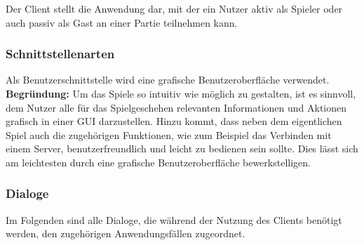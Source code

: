 Der Client stellt die Anwendung dar, mit der ein Nutzer aktiv als Spieler oder auch passiv als Gast an einer Partie teilnehmen kann.

\subsubsection{Schnittstellenarten}
Als Benutzerschnittstelle wird eine grafische Benutzeroberfläche verwendet. \\ \textbf{Begründung:} Um das Spiele so intuitiv wie möglich zu gestalten, ist es sinnvoll, dem Nutzer alle für das Spielgeschehen relevanten Informationen und Aktionen grafisch in einer GUI darzustellen. Hinzu kommt, dass neben dem eigentlichen Spiel auch die zugehörigen Funktionen, wie zum Beispiel das Verbinden mit einem Server, benutzerfreundlich und leicht zu bedienen sein sollte. Dies lässt sich am leichtesten durch eine grafische Benutzeroberfläche bewerkstelligen.

\newpage

\subsubsection{Dialoge}
Im Folgenden sind alle Dialoge, die während der Nutzung des Clients benötigt werden, den zugehörigen Anwendungsfällen zugeordnet. 

